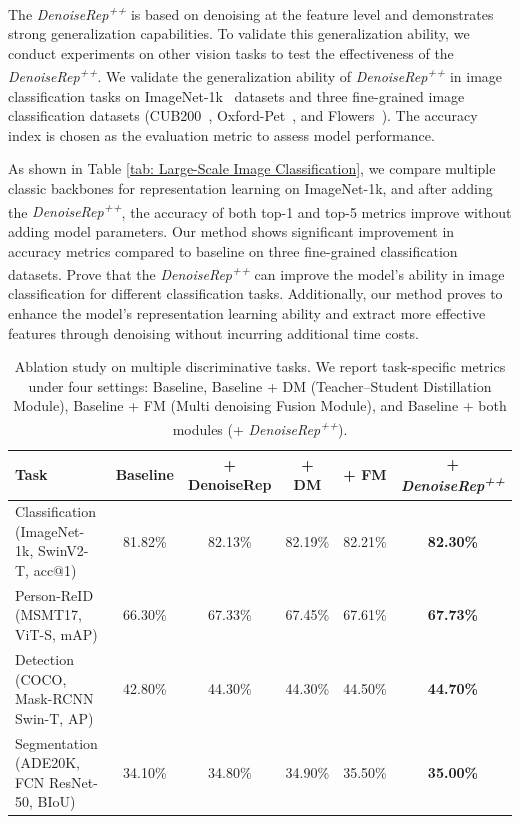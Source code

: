 \documentclass[conference]{IEEEtran}
\begin{document}
{The \textit{DenoiseRep\textsuperscript{++}} is based on denoising at the feature level and demonstrates strong generalization capabilities. To validate this generalization ability, we conduct experiments on other vision tasks to test the effectiveness of the \textit{DenoiseRep\textsuperscript{++}}. We validate the generalization ability of \textit{DenoiseRep\textsuperscript{++}} in image classification tasks on ImageNet-1k~\cite{deng2009imagenet} datasets and three fine-grained image classification datasets (CUB200~\cite{wah2011caltech}, Oxford-Pet~\cite{parkhi2012cats}, and Flowers~\cite{nilsback2008automated}). The accuracy index is chosen as the evaluation metric to assess model performance. 

As shown in Table \ref{tab: Large-Scale Image Classification}, we compare multiple classic backbones for representation learning on ImageNet-1k, and after adding the \textit{DenoiseRep\textsuperscript{++}}, the accuracy of both top-1 and top-5 metrics improve without adding model parameters. Our method shows significant improvement in accuracy metrics compared to baseline on three fine-grained classification datasets. Prove that the \textit{DenoiseRep\textsuperscript{++}} can improve the model's ability in image classification for different classification tasks. Additionally, our method proves to enhance the model's representation learning ability and extract more effective features through denoising without incurring additional time costs. 




\begin{table}[htbp]
\centering
\caption{Ablation study on multiple discriminative tasks. We report task-specific metrics under four settings: Baseline, Baseline + DM (Teacher--Student Distillation Module), Baseline + FM (Multi denoising Fusion Module), and Baseline + both modules (+ \textit{DenoiseRep\textsuperscript{++}}).}
\label{tab:ablation_all_tasks}
\vspace{0.2cm}
\renewcommand{\arraystretch}{1.2}
\begin{tabular}{l|c|c|c|c|c}
\hline\hline 
\textbf{Task} & \textbf{Baseline} & \textbf{+ DenoiseRep} & \textbf{+ DM} & \textbf{+ FM} & \textbf{+ \textit{DenoiseRep\textsuperscript{++}}} \\
\hline
Classification (ImageNet-1k, SwinV2-T, acc@1) & 81.82\% &82.13\%& 82.19\% & 82.21\% & \textbf{82.30\%} \\
Person-ReID (MSMT17, ViT-S, mAP) & 66.30\% & 67.33\%& 67.45\% & 67.61\% & \textbf{67.73\%} \\
Detection (COCO, Mask-RCNN Swin-T, AP) & 42.80\% & 44.30\%& 44.30\% & 44.50\% & \textbf{44.70\%} \\
Segmentation (ADE20K, FCN ResNet-50, BIoU) & 34.10\%  & 34.80\% & 34.90\% & 35.50\% & \textbf{35.00\%} \\
\hline \hline
\end{tabular}%
\end{table}

}
\end{document}
